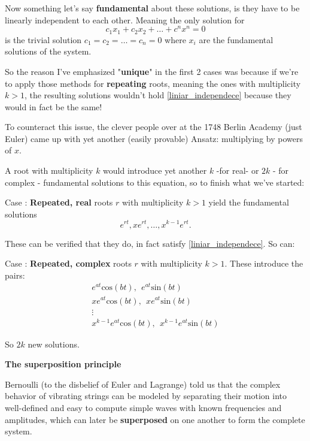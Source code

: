 Now something let's say \textbf{fundamental} about these solutions, is they have to be linearly independent to each other. Meaning the only solution for
\begin{equation}\label{liniar_independece}
	c_1 x_1+c_2 x_2 + \dots + c^n x^n = 0
\end{equation}
is the trivial solution $c_1=c_2=\dots=c_n=0$ where $x_i$ are the fundamental solutions of the system.

So the reason I've emphasized "\textbf{unique}" in the first 2 cases was because if we're to apply those methods for \textbf{repeating} roots, meaning the ones with multiplicity $k>1$, the resulting solutions wouldn't hold \ref{liniar_independece} because they would in fact be the same!

To counteract this issue, the clever people over at the 1748 Berlin Academy (just Euler) came up with yet another (easily provable) Ansatz: multiplying by powers of $x$.

A root with multiplicity $k$ would introduce yet another $k$ -for real- or $2k$ - for complex - fundamental solutions to this equation, so to finish what we've started:

Case : \textbf{Repeated, real} roots $r$ with multiplicity $k>1$ yield the fundamental solutions
\[
	e^{rt}, xe^{rt}, \dots,x^{k-1}e^{rt}.
\]

These can be verified that they do, in fact satisfy \ref{liniar_independece}. So can:

Case : \textbf{Repeated, complex} roots $r$ with multiplicity $k>1$. These introduce the pairs:
\begin{align*}
	e^{at}\text{cos}(bt), \ \  e^{at}\text{sin}(bt)  \\
	xe^{at}\text{cos}(bt), \ \ xe^{at}\text{sin}(bt) \\
	\vdots                                           \\
	x^{k-1}e^{at}\text{cos}(bt), \ \ x^{k-1}e^{at}\text{sin}(bt)
\end{align*}

So $2k$ new solutions.

\textbf{The superposition principle}\cite{Hiroki2015}

Bernoulli (to the disbelief of Euler and Lagrange) told us that the complex behavior of vibrating strings can be modeled by separating their motion into well-defined and easy to compute simple waves with known frequencies and amplitudes, which can later be \textbf{superposed} on one another to form the complete system.

